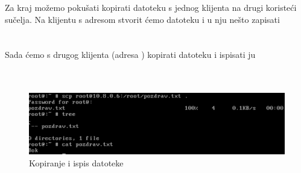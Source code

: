         Za kraj možemo pokušati kopirati datoteku s jednog klijenta na drugi
        koristeći  sučelja. Na klijentu s adresom 
        stvorit ćemo datoteku  i u nju nešto zapisati \\ 

        \noindent
         \\
         \\

        \noindent
        Sada ćemo s drugog klijenta (adresa ) kopirati
         datoteku i ispisati ju \\
         \\
        \\

        \begin{figure}[H]
            \centering
            \includegraphics[scale=0.45]{slike/pozdrav}
            \caption{Kopiranje i ispis datoteke }
        \end{figure}
